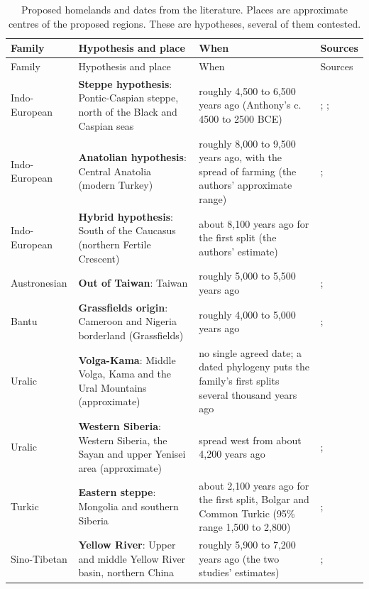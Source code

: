\documentclass[11pt,a4paper]{article}
\begin{document}
{\small\setlength{\tabcolsep}{4pt}\begin{longtable}{>{\raggedright\arraybackslash}p{2.1cm}>{\raggedright\arraybackslash}p{5.1cm}>{\raggedright\arraybackslash}p{4.1cm}>{\raggedright\arraybackslash}p{3.6cm}}\caption{Proposed homelands and dates from the literature. Places are approximate centres of the proposed regions. These are hypotheses, several of them contested.}\label{tab:homelands}\\\toprule Family & Hypothesis and place & When & Sources\\\midrule\endfirsthead\toprule Family & Hypothesis and place & When & Sources\\\midrule\endhead
Indo-European & \textbf{Steppe hypothesis}: Pontic-Caspian steppe, north of the Black and Caspian seas & roughly 4,500 to 6,500 years ago (Anthony's c. 4500 to 2500 BCE) & \citealt{anthony2007}; \citealt{anthony2015}; \citealt{haak2015}\\
Indo-European & \textbf{Anatolian hypothesis}: Central Anatolia (modern Turkey) & roughly 8,000 to 9,500 years ago, with the spread of farming (the authors' approximate range) & \citealt{renfrew1987}; \citealt{bouckaert2012}\\
Indo-European & \textbf{Hybrid hypothesis}: South of the Caucasus (northern Fertile Crescent) & about 8,100 years ago for the first split (the authors' estimate) & \citealt{heggarty2023}\\
Austronesian & \textbf{Out of Taiwan}: Taiwan & roughly 5,000 to 5,500 years ago & \citealt{blust1999}; \citealt{gray2009}\\
Bantu & \textbf{Grassfields origin}: Cameroon and Nigeria borderland (Grassfields) & roughly 4,000 to 5,000 years ago & \citealt{vansina1995}; \citealt{grollemund2015}\\
Uralic & \textbf{Volga-Kama}: Middle Volga, Kama and the Ural Mountains (approximate) & no single agreed date; a dated phylogeny puts the family's first splits several thousand years ago & \citealt{honkola2013}\\
Uralic & \textbf{Western Siberia}: Western Siberia, the Sayan and upper Yenisei area (approximate) & spread west from about 4,200 years ago & \citealt{grunthal2022}; \citealt{janhunen2009}\\
Turkic & \textbf{Eastern steppe}: Mongolia and southern Siberia & about 2,100 years ago for the first split, Bolgar and Common Turkic (95\% range 1,500 to 2,800) & \citealt{golden1992}; \citealt{savelyev2020}\\
Sino-Tibetan & \textbf{Yellow River}: Upper and middle Yellow River basin, northern China & roughly 5,900 to 7,200 years ago (the two studies' estimates) & \citealt{zhang2019}; \citealt{sagart2019}\\

\end{longtable}}
\end{document}
